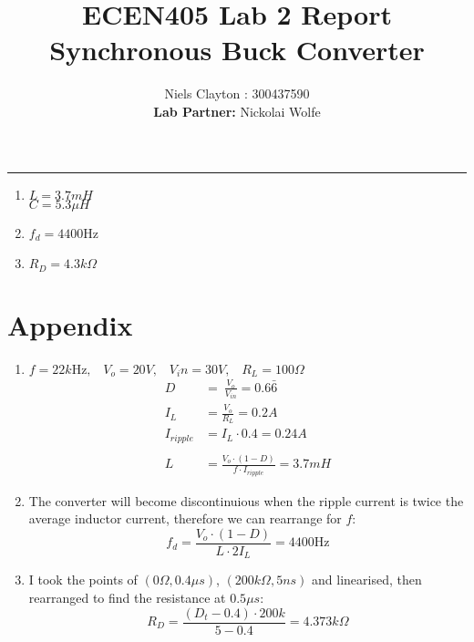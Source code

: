 \documentclass[a4paper,11pt]{article}
\begin{document}
\begin{preview}
\title{\LARGE{\textbf{ECEN405 Lab 2 Report\\Synchronous Buck Converter}}}
\author{Niels Clayton : 300437590\\\textbf{Lab Partner:} Nickolai Wolfe}
\date{}
\maketitle
\hrule

\begin{enumerate}

    \item $ L = 3.7mH $\\
    $ C = 5.3 \mu H $\\

    \item $f_d = 4400$Hz\\

    \item $R_D = 4.3k\Omega$

\end{enumerate}

\section*{Appendix}

\begin{enumerate}
  \item $ f = 22k\mathrm{Hz}, \;\;\; V_o = 20V, \;\;\; V_in=30V, \;\;\; R_L=100\Omega $
  \begin{align*}
    D\ &=\ \frac{V_{o}}{V_{in}} = 0.6\bar{6}\\
    I_{L}&=\frac{V_{o}}{R_{L}} = 0.2A\\
    I_{ripple}&=I_{L}\cdot0.4 = 0.24A\\\\
    L&=\frac{V_{o}\cdot\left(1-D\right)}{f\cdot I_{ripple}} = 3.7mH
  \end{align*}

  \item The converter will become discontinuious when the ripple current is twice the average inductor current, therefore we can rearrange for $f$:
  $$ f_{d}=\frac{V_{o}\cdot\left(1-D\right)}{L\cdot2I_{L}} = 4400\mathrm{Hz}$$

  \item I took the points of $(0\Omega , 0.4\mu s)$, $(200k\Omega , 5ns)$ and linearised, then rearranged to find the resistance at $0.5\mu s$:
  $$ R_{D}=\frac{\left(D_{t}-0.4\right)\cdot200k}{5-0.4} = 4.373k\Omega$$
\end{enumerate}


\end{preview}
\end{document}

